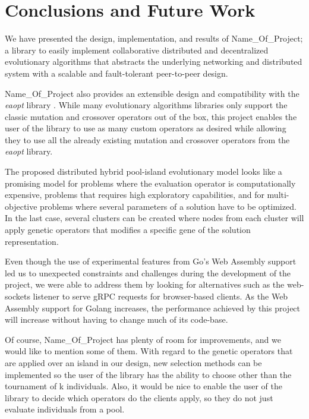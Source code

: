 \chapter{Conclusions and Future Work}

We have presented the design, implementation, and results of Name\_Of\_Project; a library to easily implement collaborative distributed and decentralized evolutionary algorithms that abstracts the underlying networking and distributed system with a scalable and fault-tolerant peer-to-peer design.

Name\_Of\_Project also provides an extensible design and compatibility with the \textit{eaopt} library \cite{eaopt}. While many evolutionary algorithms libraries only support the classic mutation and crossover operators out of the box, this project enables the user of the library to use as many custom operators as desired while allowing they to use all the already existing mutation and crossover operators from the \textit{eaopt} library.

The proposed distributed hybrid pool-island evolutionary model looks like a promising model for problems where the evaluation operator is computationally expensive, problems that requires high exploratory capabilities, and for multi-objective problems where several parameters of a solution have to be optimized. In the last case, several clusters can be created where nodes from each cluster will apply genetic operators that modifies a specific gene of the solution representation.

Even though the use of experimental features from Go's Web Assembly support led us to unexpected constraints and challenges during the development of the project, we were able to address them by looking for alternatives such as the web-sockets listener to serve gRPC requests for browser-based clients. As the Web Assembly support for Golang increases, the performance achieved by this project will increase without having to change much of its code-base.

Of course, Name\_Of\_Project has plenty of room for improvements, and we would like to mention some of them. With regard to the genetic operators that are applied over an island in our design, new selection methods can be implemented so the user of the library has the ability to choose other than the tournament of k individuals. Also, it would be nice to enable the user of the library to decide which operators do the clients apply, so they do not just evaluate individuals from a pool. 

